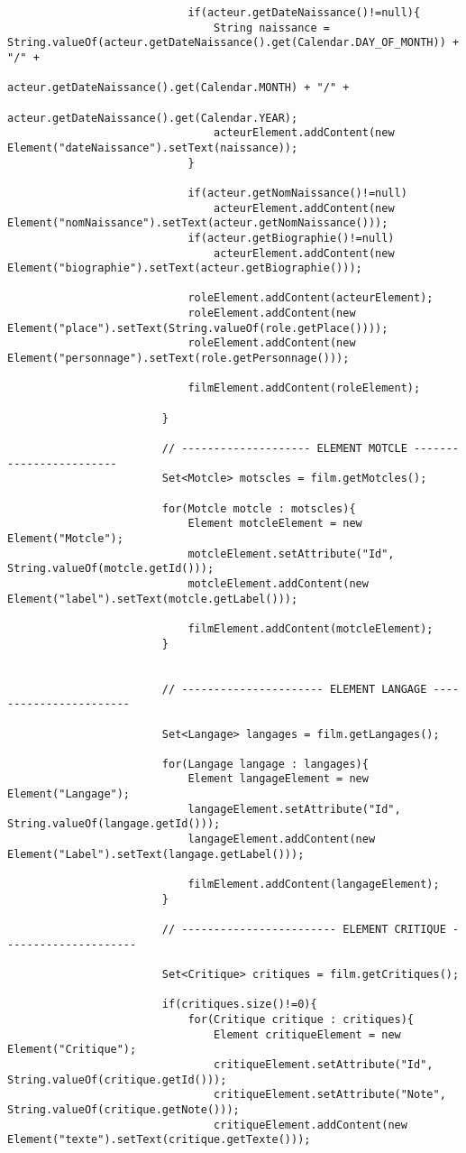 \documentclass[a4paper]{article} %
\begin{document}
\begin{lstlisting}
							if(acteur.getDateNaissance()!=null){
								String naissance = String.valueOf(acteur.getDateNaissance().get(Calendar.DAY_OF_MONTH)) + "/" +
										acteur.getDateNaissance().get(Calendar.MONTH) + "/" +
										acteur.getDateNaissance().get(Calendar.YEAR);
								acteurElement.addContent(new Element("dateNaissance").setText(naissance));
							}

							if(acteur.getNomNaissance()!=null)
								acteurElement.addContent(new Element("nomNaissance").setText(acteur.getNomNaissance()));
							if(acteur.getBiographie()!=null)
								acteurElement.addContent(new Element("biographie").setText(acteur.getBiographie()));

							roleElement.addContent(acteurElement);
							roleElement.addContent(new Element("place").setText(String.valueOf(role.getPlace())));
							roleElement.addContent(new Element("personnage").setText(role.getPersonnage()));

							filmElement.addContent(roleElement);

						}

						// -------------------- ELEMENT MOTCLE ------------------------
						Set<Motcle> motscles = film.getMotcles();

						for(Motcle motcle : motscles){
							Element motcleElement = new Element("Motcle");
							motcleElement.setAttribute("Id", String.valueOf(motcle.getId()));
							motcleElement.addContent(new Element("label").setText(motcle.getLabel()));

							filmElement.addContent(motcleElement);
						}


						// ---------------------- ELEMENT LANGAGE -----------------------

						Set<Langage> langages = film.getLangages();

						for(Langage langage : langages){
							Element langageElement = new Element("Langage");
							langageElement.setAttribute("Id", String.valueOf(langage.getId()));
							langageElement.addContent(new Element("Label").setText(langage.getLabel()));

							filmElement.addContent(langageElement);
						}

						// ------------------------ ELEMENT CRITIQUE ---------------------

						Set<Critique> critiques = film.getCritiques();

						if(critiques.size()!=0){
							for(Critique critique : critiques){
								Element critiqueElement = new Element("Critique");
								critiqueElement.setAttribute("Id", String.valueOf(critique.getId()));
								critiqueElement.setAttribute("Note", String.valueOf(critique.getNote()));
								critiqueElement.addContent(new Element("texte").setText(critique.getTexte()));


\end{lstlisting}
\end{document}
